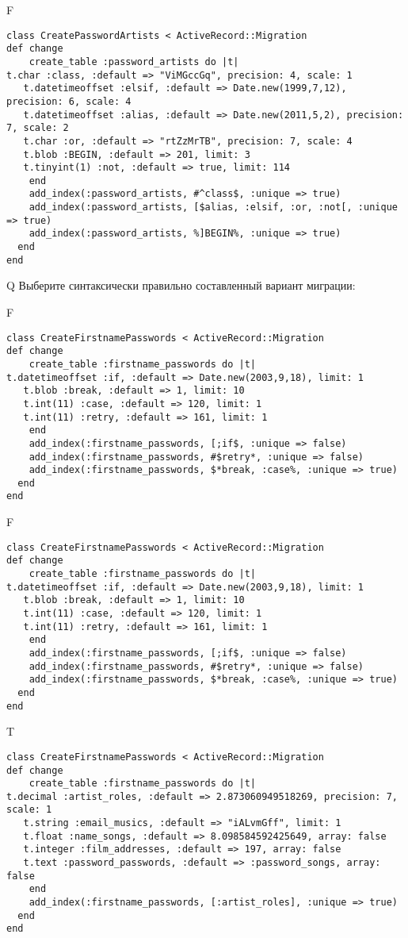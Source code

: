 F
\begin{verbatim}
class CreatePasswordArtists < ActiveRecord::Migration
def change
	create_table :password_artists do |t|
t.char :class, :default => "ViMGccGq", precision: 4, scale: 1
   t.datetimeoffset :elsif, :default => Date.new(1999,7,12), precision: 6, scale: 4
   t.datetimeoffset :alias, :default => Date.new(2011,5,2), precision: 7, scale: 2
   t.char :or, :default => "rtZzMrTB", precision: 7, scale: 4
   t.blob :BEGIN, :default => 201, limit: 3
   t.tinyint(1) :not, :default => true, limit: 114
   	end
	add_index(:password_artists, #^class$, :unique => true)
 	add_index(:password_artists, [$alias, :elsif, :or, :not[, :unique => true)
 	add_index(:password_artists, %]BEGIN%, :unique => true)
  end 
end

\end{verbatim}

Q
Выберите синтаксически правильно составленный вариант миграции:

F
\begin{verbatim}
class CreateFirstnamePasswords < ActiveRecord::Migration
def change
	create_table :firstname_passwords do |t|
t.datetimeoffset :if, :default => Date.new(2003,9,18), limit: 1
   t.blob :break, :default => 1, limit: 10
   t.int(11) :case, :default => 120, limit: 1
   t.int(11) :retry, :default => 161, limit: 1
   	end
	add_index(:firstname_passwords, [;if$, :unique => false)
 	add_index(:firstname_passwords, #$retry*, :unique => false)
 	add_index(:firstname_passwords, $*break, :case%, :unique => true)
  end 
end

\end{verbatim}

F
\begin{verbatim}
class CreateFirstnamePasswords < ActiveRecord::Migration
def change
	create_table :firstname_passwords do |t|
t.datetimeoffset :if, :default => Date.new(2003,9,18), limit: 1
   t.blob :break, :default => 1, limit: 10
   t.int(11) :case, :default => 120, limit: 1
   t.int(11) :retry, :default => 161, limit: 1
   	end
	add_index(:firstname_passwords, [;if$, :unique => false)
 	add_index(:firstname_passwords, #$retry*, :unique => false)
 	add_index(:firstname_passwords, $*break, :case%, :unique => true)
  end 
end

\end{verbatim}

T
\begin{verbatim}
class CreateFirstnamePasswords < ActiveRecord::Migration
def change
	create_table :firstname_passwords do |t|
t.decimal :artist_roles, :default => 2.873060949518269, precision: 7, scale: 1
   t.string :email_musics, :default => "iALvmGff", limit: 1
   t.float :name_songs, :default => 8.098584592425649, array: false
   t.integer :film_addresses, :default => 197, array: false
   t.text :password_passwords, :default => :password_songs, array: false
   	end
	add_index(:firstname_passwords, [:artist_roles], :unique => true)
  end 
end

\end{verbatim}

